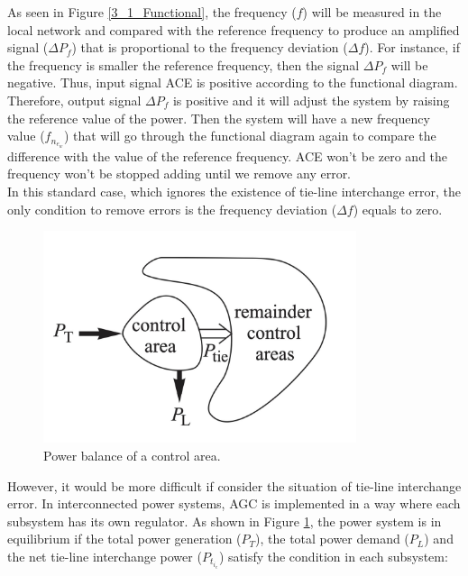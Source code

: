 \documentclass{report}
\begin{document}
As seen in Figure \textcolor{red}{\ref{3_1_Functional}}, the frequency ($f$) will be measured in the local network and compared with the reference frequency to produce an amplified signal ($\Delta P_f$) that is proportional to the frequency deviation ($\Delta f$). For instance, if the frequency is smaller the reference frequency, then the signal $\Delta P_f$ will be negative. Thus, input signal ACE is positive according to the functional diagram. Therefore, output signal $\Delta P_f$ is positive and it will adjust the system by raising the reference value of the power. Then the system will have a new frequency value ($f_n_e_w$) that will go through the functional diagram again to compare the difference with the value of the reference frequency. ACE won’t be zero and the frequency won’t be stopped adding until we remove any error.\\

In this standard case, which ignores the existence of tie-line interchange error, the only condition to remove errors is the frequency deviation ($\Delta f$) equals to zero.\\

\begin{figure}[htbp]
\centering
\includegraphics[width =0.819\textwidth]{figure/3_1_Power.png}
\caption{Power balance of a control area.}
\label{3_1_Power}
\end{figure}

However, it would be more difficult if consider the situation of tie-line interchange error. In interconnected power systems, AGC is implemented in a way where each subsystem has its own regulator. As shown in Figure \textcolor{red}{\ref{3_1_Power}}, the power system is in equilibrium if the total power generation ($P_T$), the total power demand ($P_L$) and the net tie-line interchange power ($P_t_i_e$) satisfy the condition in each subsystem:\\
\end{document}
